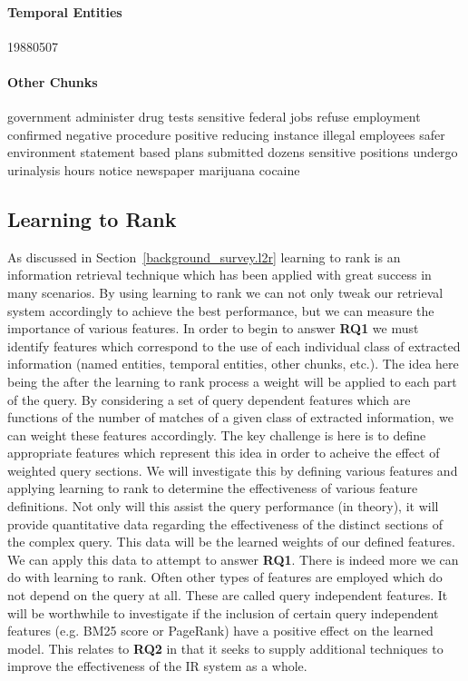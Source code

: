 \documentclass{mprop}
\begin{document}
\paragraph{Temporal Entities}
19880507

\paragraph{Other Chunks}
government
administer
drug
tests
sensitive
federal
jobs
refuse
employment
confirmed
negative
procedure
positive reducing instance illegal employees safer environment statement based plans submitted dozens sensitive positions undergo urinalysis hours notice newspaper marijuana cocaine

\subsection{Learning to Rank} \label{proposed_approach.l2r}
As discussed in Section~\ref{background_survey.l2r} learning to rank is an information retrieval technique which has been applied with great success in many scenarios.
By using learning to rank we can not only tweak our retrieval system accordingly to achieve the best performance, but we can measure the importance of various features.
In order to begin to answer \textbf{RQ1} we must identify features which correspond to the use of each individual class of extracted information (named entities, temporal entities, other chunks, etc.).
The idea here being the after the learning to rank process a weight will be applied to each part of the query.
By considering a set of query dependent features which are functions of the number of matches of a given class of extracted information, we can weight these features accordingly.
The key challenge is here is to define appropriate features which represent this idea in order to acheive the effect of weighted query sections. We will investigate this by defining various features and applying learning to rank to determine the effectiveness of various feature definitions. Not only will this assist the query performance (in theory), it will provide quantitative data regarding the effectiveness of the distinct sections of the complex query. This data will be the learned weights of our defined features. We can apply this data to attempt to answer \textbf{RQ1}.
There is indeed more we can do with learning to rank.
Often other types of features are employed which do not depend on the query at all. 
These are called query independent features.
It will be worthwhile to investigate if the inclusion of certain query independent features (e.g. BM25 score or PageRank) have a positive effect on the learned model.
This relates to \textbf{RQ2} in that it seeks to supply additional techniques to improve the effectiveness of the IR system as a whole.
\end{document}

